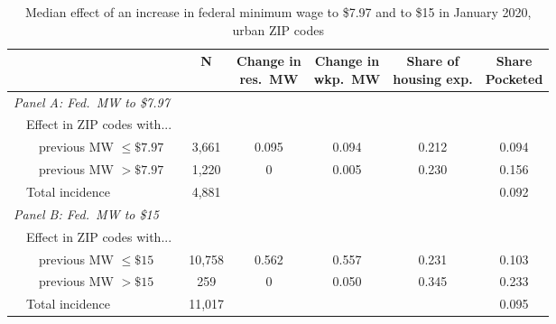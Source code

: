 \begin{table}[hbt!]
    \centering
    \caption{Median effect of an increase in federal minimum wage to \$7.97 and to \$15
             in January 2020, urban ZIP codes}
    \label{tab:counterfactuals_other}

    \begin{tabular}{@{}lccccc@{}}
        \toprule
                         & N & \shortstack{Change in\\res.\ MW}
                             & \shortstack{Change in\\wkp.\ MW}
                             & \shortstack{Share of\\housing exp.}  
                             & \shortstack{Share\\Pocketed}                      \\ \midrule
        \textit{Panel A: Fed.\ MW to \$7.97}         &      &       &       &     &      \\
        $\quad $Effect in ZIP codes with...          &      &       &       &     &      \\
        $\quad \quad$previous MW $\leq\$7.97\quad$   & 3,661 &  0.095 & 0.094  & 0.212 &  0.094   \\
        $\quad \quad$previous MW $>\$7.97\quad$      & 1,220 &  0 & 0.005  & 0.230 & 0.156    \\
        $\quad $Total incidence                      & 4,881 &      &      &     & 0.092    \\[.3em]
        \textit{Panel B: Fed.\ MW to \$15}           &      &       &       &     &      \\
        $\quad $Effect in ZIP codes with...          &      &       &       &     &      \\
        $\quad \quad$previous MW $\leq\$15\quad$     & 10,758 &  0.562 & 0.557  & 0.231 &  0.103   \\
        $\quad \quad$previous MW $>\$15\quad$        & 259 &  0 & 0.050  & 0.345 & 0.233    \\
        $\quad $Total incidence                      & 11,017 &      &      &     & 0.095    \\ \bottomrule
    \end{tabular}
    

\end{table}
